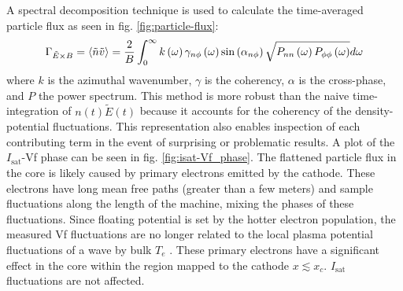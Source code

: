 A spectral decomposition technique is used to calculate the time-averaged particle flux \cite{Powers_1974} as seen in fig. \ref{fig:particle-flux}:
\begin{equation}
    \Gamma_{\tilde{E} \times B} = \langle \Tilde{n} \Tilde{v} \rangle = \frac{2}{B} \int^\infty_0 k \left( \omega \right) \gamma_{n \phi} \left( \omega \right) \sin \left( \alpha_{n \phi} \right) \sqrt{ P_{nn} \left( \omega \right) P_{\phi \phi} \left( \omega \right) } d\omega
    \label{eq:flux}
\end{equation}
where $k$ is the azimuthal wavenumber, $\gamma$ is the coherency, $\alpha$ is the cross-phase, and $P$ the power spectrum. This method is more robust than the naive time-integration of $n \left(t \right) \tilde{E} \left( t \right)$ because it accounts for the coherency of the density-potential fluctuations. This representation also enables inspection of each contributing term in the event of surprising or problematic results. A plot of the $I_\text{sat}$-Vf phase can be seen in fig. \ref{fig:isat-Vf_phase}. The flattened particle flux in the core is likely caused by primary electrons emitted by the cathode. These electrons have long mean free paths (greater than a few meters) and sample fluctuations along the length of the machine, mixing the phases of these fluctuations. Since floating potential is set by the hotter electron population, the measured Vf fluctuations are no longer related to the local plasma potential fluctuations of a wave by bulk $T_e$ \cite{Carter_2009}. These primary electrons have a significant effect in the core within the region mapped to the cathode $x \lesssim x_c$. $I_\text{sat}$ fluctuations are not affected.

